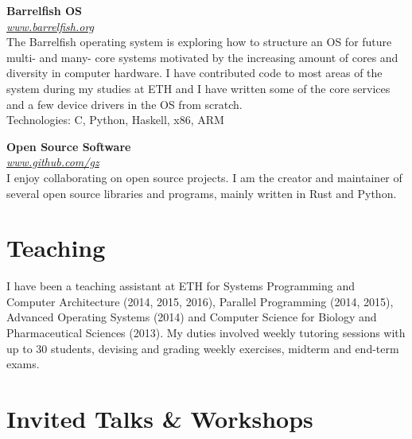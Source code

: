\documentclass[margin,line]{cv/cv}
\begin{document}
\begin{resume}
    \textbf{Barrelfish OS} \\\vspace{1mm}%
    \textsl{\url{www.barrelfish.org}} \hfill \\
    The Barrelfish operating system is exploring how to structure an OS for future
    multi- and many- core systems motivated by the increasing amount of cores and
    diversity in computer hardware. I have contributed code to most areas of the
    system during my studies at ETH and I have written some of the core services
    and a few device drivers in the OS from scratch.\\ Technologies: C, Python,
    Haskell, x86, ARM

    \textbf{Open Source Software} \\\vspace{1mm}%
    \textsl{\url{www.github.com/gz}} \hfill \\
    I enjoy collaborating on open source projects. I am the creator and maintainer
    of several open source libraries and programs, mainly written in Rust and
    Python.

    \section{\mysidestyle Teaching}

    I have been a teaching assistant at ETH for Systems Programming and Computer
    Architecture (2014, 2015, 2016), Parallel Programming (2014, 2015), Advanced
    Operating Systems (2014) and Computer Science for Biology and Pharmaceutical
    Sciences (2013). My duties involved weekly tutoring sessions with up to 30
    students, devising and grading weekly exercises, midterm and end-term exams.

    \pagebreak

    \section{\mysidestyle Invited Talks \& Workshops}


\end{resume}
\end{document}
